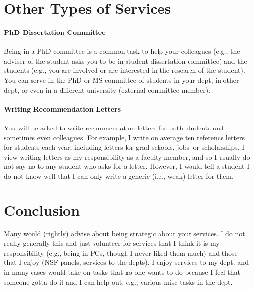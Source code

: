 \documentclass[oneside,11pt,dvipsnames]{book}
\begin{document}
\section{Other Types of Services}

\paragraph{PhD Dissertation Committee} Being in a PhD committee is a common task to help your colleagues (e.g., the adviser of the student asks you to be in student dissertation committee) and the students (e.g., you are involved or are interested in the research of the student).  You can serve in the PhD or MS committee of students in your dept, in other dept, or even in a different university (external committee member).

\paragraph{Writing Recommendation Letters} You will be asked to write recommendation letters for both students and sometimes even colleagues. For example, I write on average ten reference letters for students each year, including letters for grad schools, jobs, or scholarships. I view writing letters as my responsibility as a faculty member, and so I usually do not say no to any student who asks for a letter. However, I would tell a student I do not know well that I can only write a generic  (i.e., weak) letter for them. 


\section{Conclusion}

Many would (rightly) advise about being strategic about your services. I do not really generally this and just volunteer for services that I think it is my responsibility (e.g., being in PCs, though I never liked them much) and those that I enjoy (NSF panels, services to the depts). I enjoy services to my dept. and in many cases would take on tasks that no one wants to do because I feel that someone gotta do it and I can help out, e.g., various misc tasks in the dept.


\end{document}

